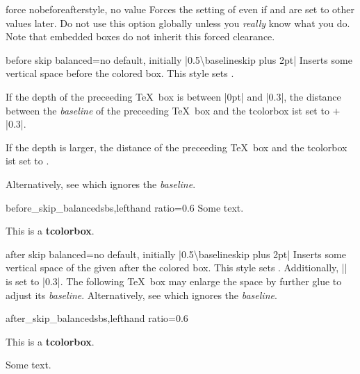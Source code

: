 \begin{docTcbKey}{force nobeforeafter}{}{style, no value}
  Forces the setting of  even if
   and  are set to other values
  later. Do not use this option globally unless you \emph{really} know what you do.
  Note that embedded boxes do not inherit this forced clearance.
\end{docTcbKey}


\clearpage

\begin{docTcbKey}[][doc new={2020-09-25}]{before skip balanced}{=}{no default, initially |0.5\textbackslash baselineskip plus 2pt|}
  Inserts some vertical space before the colored box. This style sets .\par
  If the depth of the
  preceeding \TeX\ box is between |0pt| and |0.3\baselineskip|,
  the distance between the \emph{baseline} of the preceeding \TeX\ box and the tcolorbox
  ist set to $+$|0.3\baselineskip|.\par
  If the depth is larger, the distance of the preceeding \TeX\ box and the tcolorbox
  ist set to .\par
  Alternatively, see  which ignores the \emph{baseline}.

\begin{exdispExample*}{before_skip_balanced}{sbs,lefthand ratio=0.6}
Some text.
\begin{tcolorbox}[before skip balanced=1cm,
    colframe=red!50!white]
  This is a \textbf{tcolorbox}.
\end{tcolorbox}
\end{exdispExample*}
\end{docTcbKey}

\begin{docTcbKey}[][doc new={2020-09-25}]{after skip balanced}{=}{no default, initially |0.5\textbackslash baselineskip plus 2pt|}
  Inserts some vertical space of the given  after the colored box.
  This style sets .
  Additionally, |\prevdepth| is set to |0.3\baselineskip|. The following
  \TeX\ box may enlarge the space by further glue to adjust its \emph{baseline}.
  Alternatively, see  which ignores the \emph{baseline}.

\begin{exdispExample*}{after_skip_balanced}{sbs,lefthand ratio=0.6}
\begin{tcolorbox}[after skip balanced=1cm,
    colframe=red!50!white]
  This is a \textbf{tcolorbox}.
\end{tcolorbox}
Some text.
\end{exdispExample*}
\end{docTcbKey}


